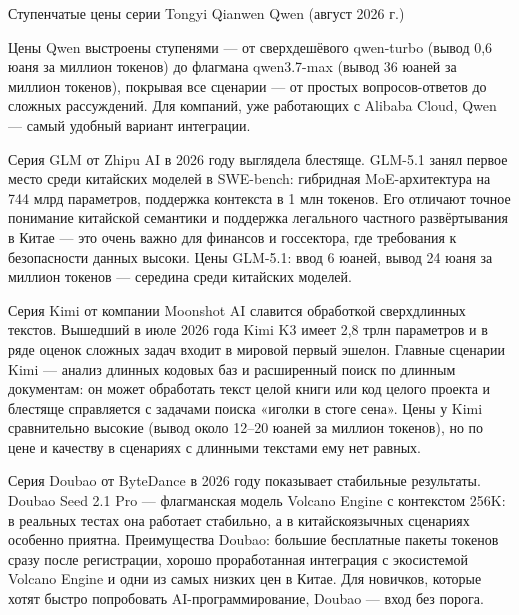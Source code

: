 \begin{center}\small\color{gray}Ступенчатые цены серии Tongyi Qianwen Qwen (август 2026 г.)\end{center}

Цены Qwen выстроены ступенями — от сверхдешёвого qwen-turbo (вывод 0,6 юаня за миллион токенов) до флагмана qwen3.7-max (вывод 36 юаней за миллион токенов), покрывая все сценарии — от простых вопросов-ответов до сложных рассуждений. Для компаний, уже работающих с Alibaba Cloud, Qwen — самый удобный вариант интеграции.


Серия GLM от Zhipu AI в 2026 году выглядела блестяще. GLM-5.1 занял первое место среди китайских моделей в SWE-bench: гибридная MoE-архитектура на 744 млрд параметров, поддержка контекста в 1 млн токенов. Его отличают точное понимание китайской семантики и поддержка легального частного развёртывания в Китае — это очень важно для финансов и госсектора, где требования к безопасности данных высоки. Цены GLM-5.1: ввод 6 юаней, вывод 24 юаня за миллион токенов — середина среди китайских моделей.


Серия Kimi от компании Moonshot AI славится обработкой сверхдлинных текстов. Вышедший в июле 2026 года Kimi K3 имеет 2,8 трлн параметров и в ряде оценок сложных задач входит в мировой первый эшелон. Главные сценарии Kimi — анализ длинных кодовых баз и расширенный поиск по длинным документам: он может обработать текст целой книги или код целого проекта и блестяще справляется с задачами поиска «иголки в стоге сена». Цены у Kimi сравнительно высокие (вывод около 12–20 юаней за миллион токенов), но по цене и качеству в сценариях с длинными текстами ему нет равных.


Серия Doubao от ByteDance в 2026 году показывает стабильные результаты. Doubao Seed 2.1 Pro — флагманская модель Volcano Engine с контекстом 256K: в реальных тестах она работает стабильно, а в китайскоязычных сценариях особенно приятна. Преимущества Doubao: большие бесплатные пакеты токенов сразу после регистрации, хорошо проработанная интеграция с экосистемой Volcano Engine и одни из самых низких цен в Китае. Для новичков, которые хотят быстро попробовать AI-программирование, Doubao — вход без порога.

